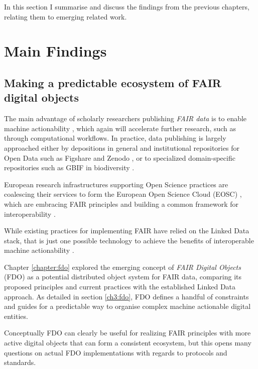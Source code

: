 In this section I summarise and discuss the findings from the previous chapters, relating them to emerging related work. 



\section{Main Findings}

\subsection{Making a predictable ecosystem of FAIR digital objects}

The main advantage of scholarly researchers publishing \emph{FAIR data} is to enable machine actionability \cite{Wilkinson 2016}, which again will accelerate further research, such as through computational workflows. 
In practice, data publishing is largely approached either by depositions in general and institutional repositories for Open Data such as Figshare and Zenodo \cite{Dillen 2019}, or to specialized domain-specific repositories such as GBIF in biodiversity \cite{ch8-7}. 

European research infrastructures supporting Open Science practices are coalescing their services to form the European Open Science Cloud (EOSC) \cite{10.2777/940154}, which are embracing FAIR principles \cite{Mons 2017} and building a common framework for interoperability \cite{eosc-interop-framework}. 

While existing practices for implementing FAIR have relied on the Linked Data stack, that is just one possible technology to achieve the benefits of interoperable machine actionability \cite{Mons 2017}. 

Chapter \ref{chapter:fdo} explored the emerging concept of \emph{FAIR Digital Objects} (FDO) \cite{Schultes 2019} as a potential distributed object system for FAIR data, comparing its proposed principles and current practices with the established Linked Data approach. 
As detailed in section \vref{ch3:fdo}, FDO defines a handful of constraints and guides for a predictable way to organise complex machine actionable digital entities. 

Conceptually FDO can clearly be useful for realizing FAIR principles with more active digital objects that can form a consistent ecosystem, but this opens many questions on actual FDO implementations with regards to protocols and standards.

